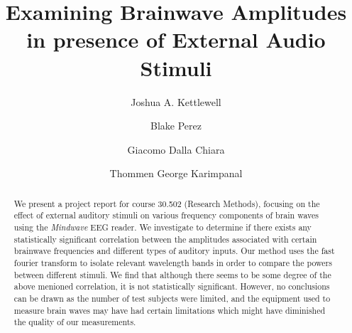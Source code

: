 \documentclass[twocolumn,superscriptaddress]{revtex4-1}
\theoremstyle{definition}
\theoremstyle{remark}
\begin{document}

\title{Examining Brainwave Amplitudes in presence of External Audio Stimuli}%

\author{Joshua A. Kettlewell}
\author{Blake Perez}
\author{Giacomo Dalla Chiara}
\author{Thommen George Karimpanal}




\begin{abstract}
We present a project report for course 30.502 (Research Methods), focusing on the effect of external auditory stimuli on various frequency components of brain waves using the \emph{Mindwave} EEG reader. We investigate to determine if there exists any statistically significant correlation between the amplitudes associated with certain brainwave frequencies and different types of auditory inputs. Our method uses the fast fourier transform to isolate relevant wavelength bands in order to compare the powers between different stimuli. We find that although there seems to be some degree of the above menioned correlation, it is not statistically significant. However, no conclusions can be drawn as the number of test subjects were limited, and the equipment used to measure brain waves may have had certain limitations which might have diminished the quality of our measurements.
\end{abstract}

\maketitle
\end{document}
